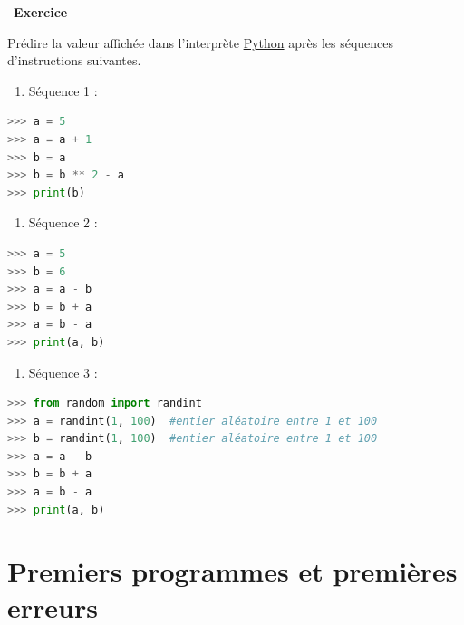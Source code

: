 \documentclass[
  11pt,
]{article}
\providecommand{\tightlist}{%
  \setlength{\itemsep}{0pt}\setlength{\parskip}{0pt}}
\newcounter{exo}
\newenvironment{exercice}[1]
{\par \medskip   \addtocounter{exo}{1} \noindent  
\begin{bclogo}[arrondi =0.1,   noborder = true, logo=\bccrayon, marge=4]{~\textbf{Exercice} \textbf{\theexo} {\itshape #1} }  \par}
{
\end{bclogo}
 \par \bigskip }
\newcounter{def}
\newcounter{prog}
\begin{document}
\begin{exercice}{}

Prédire la valeur affichée dans l'interprète
\href{https://docs.python.org/3/tutorial/datastructures.html}{Python}
après les séquences d'instructions suivantes.

\begin{enumerate}
\def\labelenumi{\arabic{enumi}.}
\tightlist
\item
  Séquence 1 :
\end{enumerate}

\begin{lstlisting}[language=Python]
>>> a = 5
>>> a = a + 1
>>> b = a
>>> b = b ** 2 - a
>>> print(b)
\end{lstlisting}

\begin{enumerate}
\def\labelenumi{\arabic{enumi}.}
\setcounter{enumi}{1}
\tightlist
\item
  Séquence 2 :
\end{enumerate}

\begin{lstlisting}[language=Python]
>>> a = 5
>>> b = 6
>>> a = a - b
>>> b = b + a
>>> a = b - a
>>> print(a, b)
\end{lstlisting}

\begin{enumerate}
\def\labelenumi{\arabic{enumi}.}
\setcounter{enumi}{2}
\tightlist
\item
  Séquence 3 :
\end{enumerate}

\begin{lstlisting}[language=Python]
>>> from random import randint
>>> a = randint(1, 100)  #entier aléatoire entre 1 et 100
>>> b = randint(1, 100)  #entier aléatoire entre 1 et 100
>>> a = a - b
>>> b = b + a
>>> a = b - a
>>> print(a, b)
\end{lstlisting}

\end{exercice}

\hypertarget{premiers-programmes-et-premiuxe8res-erreurs}{%
\section{Premiers programmes et premières
erreurs}\label{premiers-programmes-et-premiuxe8res-erreurs}}
\end{document}
